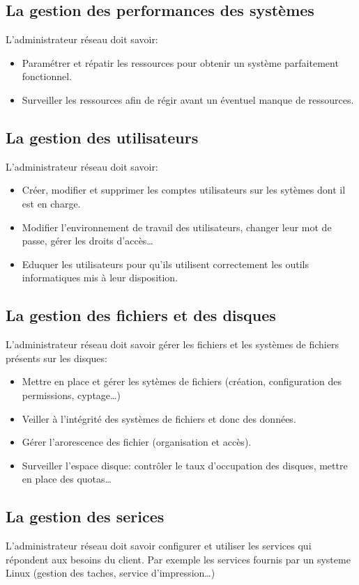 \documentclass[10pt,a4paper]{article}
\begin{document}
 \subsection{La gestion des performances des systèmes}
 L'administrateur réseau doit savoir:
 \begin{itemize}
	 \item Paramétrer et répatir les ressources pour obtenir un système parfaitement fonctionnel.
	 \item Surveiller les ressources afin de régir avant un éventuel manque de ressources.
 \end{itemize}

 \subsection{La gestion des utilisateurs}
 L'administrateur réseau doit savoir:
 \begin{itemize}
	 \item Créer, modifier et supprimer les comptes utilisateurs sur les sytèmes dont il est en charge.
	 \item Modifier l'environnement de travail des utilisateurs, changer leur mot de passe, gérer les droits d'accès\ldots
	 \item Eduquer les utilisateurs pour qu'ils utilisent correctement les outils informatiques mis à leur disposition.
 \end{itemize}

 \subsection{La gestion des fichiers et des disques}
 L'administrateur réseau doit savoir gérer les fichiers et les systèmes de fichiers présents sur les disques:
 \begin{itemize}
	 \item Mettre en place et gérer les sytèmes de fichiers (création, configuration des permissions, cyptage\ldots)
	 \item Veiller à l'intégrité des systèmes de fichiers et donc des données.
	 \item Gérer l'arorescence des fichier (organisation et accès).
	 \item Surveiller l'espace disque: contrôler le taux d'occupation des disques, mettre en place des quotas\ldots
 \end{itemize}

 \subsection{La gestion des serices}
 L'administrateur réseau doit savoir configurer et utiliser les services qui répondent aux besoins du client. Par exemple les services fournis par un systeme Linux (gestion des taches, service d'impression\ldots)
\end{document}
